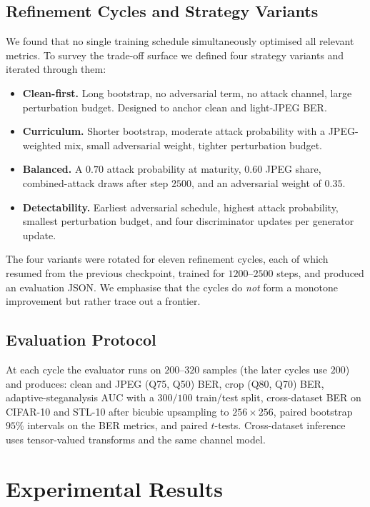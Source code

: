 \documentclass[journal]{IEEEtran}
\begin{document}
\subsection{Refinement Cycles and Strategy Variants}
We found that no single training schedule simultaneously optimised
all relevant metrics. To survey the trade-off surface we defined
four strategy variants and iterated through them:

\begin{itemize}
    \item \textbf{Clean-first.} Long bootstrap, no adversarial term,
    no attack channel, large perturbation budget. Designed to
    anchor clean and light-JPEG BER.
    \item \textbf{Curriculum.} Shorter bootstrap, moderate
    attack probability with a JPEG-weighted mix, small adversarial
    weight, tighter perturbation budget.
    \item \textbf{Balanced.} A $0.70$ attack probability at
    maturity, $0.60$ JPEG share, combined-attack draws after step
    $2500$, and an adversarial weight of $0.35$.
    \item \textbf{Detectability.} Earliest adversarial schedule,
    highest attack probability, smallest perturbation budget, and
    four discriminator updates per generator update.
\end{itemize}

The four variants were rotated for eleven refinement cycles, each of
which resumed from the previous checkpoint, trained for $1200$--$2500$
steps, and produced an evaluation JSON. We emphasise that the cycles
do \emph{not} form a monotone improvement but rather trace out a
frontier.

\subsection{Evaluation Protocol}
At each cycle the evaluator runs on $200$--$320$ samples (the later
cycles use $200$) and produces: clean and JPEG (Q75, Q50) BER, crop
(Q80, Q70) BER, adaptive-steganalysis AUC with a $300/100$ train/test
split, cross-dataset BER on CIFAR-10 and STL-10 after bicubic
upsampling to $256{\times}256$, paired bootstrap $95\%$ intervals on
the BER metrics, and paired $t$-tests. Cross-dataset inference uses
tensor-valued transforms and the same channel model.

\section{Experimental Results}
\label{sec:experiments}
\end{document}
